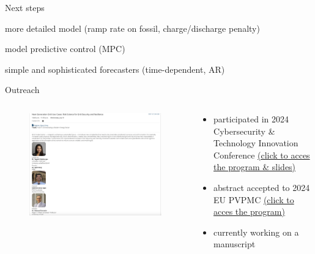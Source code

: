 \documentclass[aspectratio=169,11pt]{beamer}
\begin{document}
\begin{frame}{Next steps} 
\BIT
\item more detailed model (ramp rate on fossil, charge/discharge penalty)
\item model predictive control (MPC)
\item simple and sophisticated forecasters (time-dependent, AR)
\EIT
\end{frame}
    

\begin{frame}{Outreach}
\begin{columns}
    \begin{column}{0.6\textwidth}
        \begin{figure}
            \centering
            \includegraphics[width=\columnwidth]{./figures/cybercon_program.png}
        \end{figure}
    \end{column}
    \begin{column}{0.4\textwidth}
        \begin{itemize}
            \item participated in 2024 Cybersecurity \& Technology Innovation Conference
            \href{https://www.doecybercon.com/Program/Agenda}{(click to acces the program \& slides)}
            \item abstract accepted to 2024 EU PVPMC
            \href{https://www.sandia.gov/app/uploads/sites/243/dlm_uploads/2024/08/2024-European-PVPMC-Program-V9.pdf}{(click to acces the program)}
            \item currently working on a manuscript
        \end{itemize}
    \end{column}
\end{columns}
\end{frame}
    


	
\end{document}
